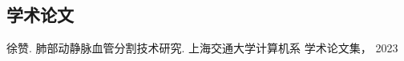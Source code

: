 
\begin{achievements}

\subsection*{学术论文}

\begin{bibliolist}{00}
	\item 徐赞. 肺部动静脉血管分割技术研究.  上海交通大学计算机系 学术论文集， 2023
\end{bibliolist}

\begin{bibliolist*}{00}
\end{bibliolist*}



\end{achievements}
